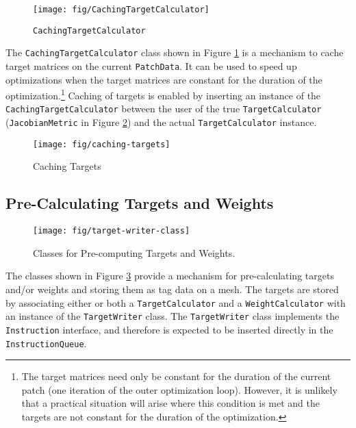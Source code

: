 \documentclass{article}
\begin{document}
\begin{figure}[htb]
\begin{center}
\texttt{[image: fig/CachingTargetCalculator]}
\caption{\texttt{CachingTargetCalculator}\label{fig:cachetarget}}
\end{center}
\end{figure}

The \texttt{CachingTargetCalculator} class shown in Figure \ref{fig:cachetarget} is a mechanism to cache target matrices on the current \texttt{PatchData}.  It can be used to speed up optimizations when the target matrices are constant for the duration of the optimization.\footnote{The target matrices need only be constant for the duration of the current patch (one iteration of the outer optimization loop).  However, it is unlikely that a practical situation will arise where this condition is met and the targets are not constant for the duration of the optimization.}  Caching of targets is enabled by inserting an instance of the \texttt{CachingTargetCalculator} between the user of the true \texttt{TargetCalculator} (\texttt{JacobianMetric} in Figure \ref{fig:usecachetarget}) and the actual \texttt{TargetCalculator} instance.

\begin{figure}[htb]
\begin{center}
\texttt{[image: fig/caching-targets]}
\caption{Caching Targets\label{fig:usecachetarget}}
\end{center}
\end{figure}


\subsection{Pre-Calculating Targets and Weights}

\begin{figure}[htb]
\begin{center}
\texttt{[image: fig/target-writer-class]}
\caption{Classes for Pre-computing Targets and Weights.\label{fig:targetwriter}}
\end{center}
\end{figure}

The classes shown in Figure \ref{fig:targetwriter} provide a mechanism for pre-calculating targets and/or weights and storing them as tag data on a mesh.  The targets are stored by associating either or both a \texttt{TargetCalculator} and a \texttt{WeightCalculator} with an instance of the \texttt{TargetWriter} class.  The \texttt{TargetWriter} class implements the \texttt{Instruction} interface, and therefore is expected to be inserted directly in the \texttt{InstructionQueue}.  
\end{document}
